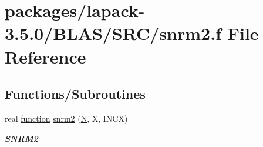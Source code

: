 \hypertarget{lapack-3_85_80_2BLAS_2SRC_2snrm2_8f}{}\section{packages/lapack-\/3.5.0/\+B\+L\+A\+S/\+S\+R\+C/snrm2.f File Reference}
\label{lapack-3_85_80_2BLAS_2SRC_2snrm2_8f}
\subsection*{Functions/\+Subroutines}
\begin{DoxyCompactItemize}
\item 
real \hyperlink{afunc_8m_a7b5e596df91eadea6c537c0825e894a7}{function} \hyperlink{group__single__blas__level1_ga35c2ec0e9bfdaa545320c2a134fcc471}{snrm2} (\hyperlink{polmisc_8c_a0240ac851181b84ac374872dc5434ee4}{N}, X, I\+N\+C\+X)
\begin{DoxyCompactList}\small\item\em {\bfseries S\+N\+R\+M2} \end{DoxyCompactList}\end{DoxyCompactItemize}
